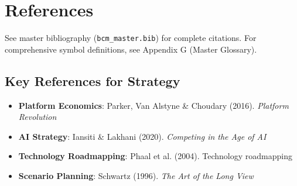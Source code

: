 \section{References}
\label{sec:vvv-references}

\nocite{bcm_master}
See master bibliography (\texttt{bcm\_master.bib}) for complete citations.
For comprehensive symbol definitions, see Appendix G (Master Glossary).

\subsection{Key References for Strategy}

\begin{itemize}[nosep]
\item \textbf{Platform Economics}: Parker, Van Alstyne \& Choudary (2016). \textit{Platform Revolution}
\item \textbf{AI Strategy}: Iansiti \& Lakhani (2020). \textit{Competing in the Age of AI}
\item \textbf{Technology Roadmapping}: Phaal et al. (2004). Technology roadmapping
\item \textbf{Scenario Planning}: Schwartz (1996). \textit{The Art of the Long View}
\end{itemize}


